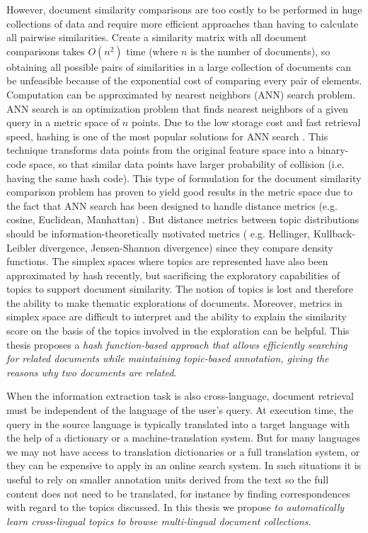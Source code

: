 
However, document similarity comparisons are too costly to be performed in huge collections of data and require more efficient approaches than having to calculate all pairwise similarities. Create a similarity matrix with all document comparisons takes $O(n^2)$ time (where $n$ is the number of documents), so obtaining all possible pairs of similarities in a large collection of documents can be unfeasible because of the exponential cost of comparing every pair of elements. Computation can be approximated by nearest neighbors (ANN) search problem. ANN search is an optimization problem that finds nearest neighbors of a given query in a metric space of $n$ points. Due to the low storage cost and fast retrieval speed, hashing is one of the most popular solutions for ANN search \cite{Zhen2016}. This technique transforms data points from the original feature space into a binary-code space, so that similar data points have larger probability of collision (i.e. having the same hash code). This type of formulation for the document similarity comparison problem has proven to yield good results in the metric space due to the fact that ANN search has been designed to handle distance metrics (e.g. cosine, Euclidean, Manhattan) \cite{Krstovski2011}. But distance metrics between topic distributions should be information-theoretically motivated metrics ( e.g. Hellinger, Kullback-Leibler divergence, Jensen-Shannon divergence) since they compare density functions. The simplex spaces where topics are represented have also been  approximated by hash \cite{Mao2017} recently, but sacrificing the exploratory capabilities of topics to support document similarity. The notion of topics is lost and therefore the ability to make thematic explorations of documents. Moreover, metrics in simplex space are difficult to interpret and the ability to explain the similarity score on the basis of the topics involved in the exploration can be helpful. 
This thesis proposes a \textit{hash function-based approach that allows efficiently searching for related documents while maintaining topic-based annotation, giving the reasons why two documents are related}. 



When the information extraction task is also cross-language, document retrieval must be independent of the language of the user's query. At execution time, the query in the source language is typically translated into a target language with the help of a dictionary or a machine-translation system. But for many languages we may not have access to translation dictionaries or a full translation system, or they can be expensive to apply in an online search system. In such situations it is useful to rely on smaller annotation units derived from the text so the full content does not need to be translated, for instance by finding correspondences with regard to the topics discussed. In this thesis we propose \textit{to automatically learn cross-lingual topics to browse multi-lingual document collections}.


